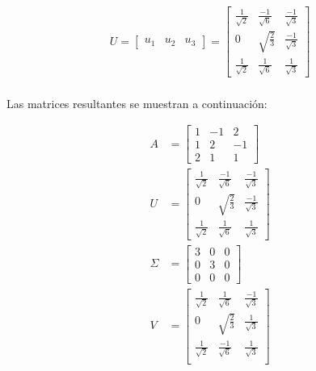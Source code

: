 \documentclass[a4paper, spanish]{article}
\begin{document}
  \begin{align}
    U =
    \begin{bmatrix}
      u_1 & u_2 & u_3
    \end{bmatrix} =
    \begin{bmatrix}
      \frac{1}{\sqrt{2}} & \frac{-1}{\sqrt{6}} & \frac{-1}{\sqrt{3}} \\
      0 & \sqrt{\frac{2}{3}} & \frac{-1}{\sqrt{3}} \\
      \frac{1}{\sqrt{2}} & \frac{1}{\sqrt{6}} & \frac{1}{\sqrt{3}}
    \end{bmatrix}
  \end{align}

  \paragraph{}
  Las matrices resultantes se muestran a continuación:

  \begin{align}
    A &=
    \begin{bmatrix}
      1 & -1 & 2\\
      1 & 2 & -1\\
      2 & 1 & 1
    \end{bmatrix} \\
    U &=
    \begin{bmatrix}
      \frac{1}{\sqrt{2}} & \frac{-1}{\sqrt{6}} & \frac{-1}{\sqrt{3}} \\
      0 & \sqrt{\frac{2}{3}} & \frac{-1}{\sqrt{3}} \\
      \frac{1}{\sqrt{2}} & \frac{1}{\sqrt{6}} & \frac{1}{\sqrt{3}}
    \end{bmatrix} \\
    \Sigma &=
    \begin{bmatrix}
      3 & 0 & 0\\
      0 & 3 & 0\\
      0 & 0 & 0
    \end{bmatrix} \\
    V &=
    \begin{bmatrix}
      \frac{1}{\sqrt{2}} & \frac{1}{\sqrt{6}} & \frac{-1}{\sqrt{3}} \\
      0 & \sqrt{\frac{2}{3}} &\frac{1}{\sqrt{3}} \\
      \frac{1}{\sqrt{2}} & \frac{-1}{\sqrt{6}} & \frac{1}{\sqrt{3}} \\
    \end{bmatrix}
  \end{align}
\end{document}
